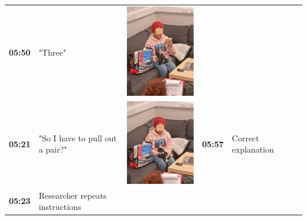 \documentclass[twocolumn, issue, empirical, authordate,drafn]{jote-new-article}
\begin{document}
\begin{table}[ht!]
\begin{tabularx}{\linewidth}{@{} m{.05\linewidth} m{.2\linewidth} >{\raggedleft\arraybackslash}m{.19\linewidth}  m{.05\linewidth} m{.2\linewidth} >{\raggedleft\arraybackslash}m{.19\linewidth} }
  \textbf{05:50} & "Three" & \includegraphics[height=.15\textheight, width=.8\linewidth]{media/image13.png} \\
 \textbf{05:21} & "So I have to pull out a pair?" & \includegraphics[height=.15\textheight, width=.8\linewidth]{media/image9.png} &
 \textbf{05:57} & Correct explanation & \\
 \textbf{05:23} & Researcher repeats instructions & \\ 

\end{tabularx} 
\end{table}
\end{document}
